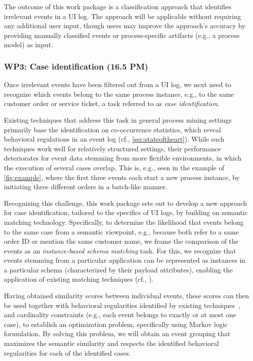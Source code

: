 The outcome of this work package is a classification approach that identifies irrelevant events in a UI log. The approach will be applicable without requiring any additional user input, though users may improve the approach's accuracy by providing manually classified events or process-specific artifacts (e.g., a process model) as input.

\subsubsection{WP3: Case identification (16.5 PM)}
\label{sec:wp3}

Once irrelevant events have been filtered out from  a UI log, we next need to recognize which events belong to the same process instance, e.g., to the same customer order or service ticket, a task referred to as \emph{case identification}.

Existing techniques that address this task in general process mining settings primarily base the identification on co-occurrence statistics, which reveal behavioral regulations in an event log (cf., \autoref{sec:stateoftheart}). While such techniques work well for relatively structured settings, their performance deteriorates for event data stemming from more flexible environments, in which the execution of several cases overlap. This is, e.g., seen in the example of \autoref{fig:example}, where the first three events each start a new process instance, by initiating three different orders in a batch-like manner.

Recognizing this challenge, this work package sets out to develop a new approach for case identification, tailored to the specifics of UI logs, by building on semantic matching technology.
Specifically, to determine the likelihood that events belong to the same case from a semantic viewpoint, e.g., because both refer to a same order ID or mention the same customer name, we frame the comparison of the events as an \emph{instance-based schema matching} task. For this, we recognize that events stemming from a particular application can be represented as instances in a particular schema (characterized by their payload attributes), enabling the application of existing matching techniques (cf., \cite{rinaldi2018matching,lehmberg2017stitching}).

 Having obtained similarity scores between individual events, these scores can then be used together with behavioral regularities identified by existing techniques~\cite{diba2020extraction,ferreira2009discovering}, and cardinality constraints (e.g., each event belongs to exactly or at most one case), to establish an optimization problem, specifically using Markov logic formulation. By solving this problem, we will obtain an event grouping that maximizes the semantic similarity and respects the identified behavioral regularities for each of the identified cases.

